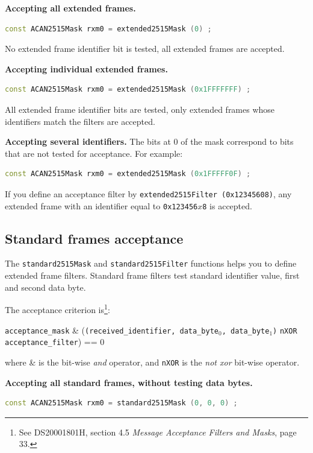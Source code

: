 \documentclass[9pt, a4paper, obeyspaces]{extarticle}
\begin{document}
{\bf Accepting all extended frames.}
{ \small\begin{lstlisting}[language=c++]
  const ACAN2515Mask rxm0 = extended2515Mask (0) ;
\end{lstlisting}}
No extended frame identifier bit is tested, all extended frames are accepted.

{\bf Accepting individual extended frames.}
{ \small\begin{lstlisting}[language=c++]
  const ACAN2515Mask rxm0 = extended2515Mask (0x1FFFFFFF) ;
\end{lstlisting}}
All extended frame identifier bits are tested, only extended frames whose identifiers match the filters are accepted.


{\bf Accepting several identifiers.}
The bits at 0 of the mask correspond to bits that are not tested for acceptance. For example:
{ \small\begin{lstlisting}[language=c++]
  const ACAN2515Mask rxm0 = extended2515Mask (0x1FFFFF0F) ;
\end{lstlisting}}

If you define an acceptance filter by \texttt{extended2515Filter (0x12345608)}, any extended frame with an identifier equal to \texttt{0x123456$x$8} is accepted.












\subsection{Standard frames acceptance}

The \texttt{standard2515Mask} and \texttt{standard2515Filter} functions helps you to define extended frame filters. Standard frame filters test standard identifier value, first and second data byte.

The acceptance criterion is\footnote{See DS20001801H, section 4.5 \emph{Message Acceptance Filters and Masks}, page 33.}:

\begin{center}\small
\texttt{acceptance\_mask} \& (\texttt{(received\_identifier, data\_byte$_0$, data\_byte$_1$)} \texttt{nXOR} \texttt{acceptance\_filter}) == 0
\end{center}
where \& is the bit-wise \emph{and} operator, and \texttt{nXOR} is the \emph{not xor} bit-wise operator.

{\bf Accepting all standard frames, without testing data bytes.}
{ \small\begin{lstlisting}[language=c++]
  const ACAN2515Mask rxm0 = standard2515Mask (0, 0, 0) ;
\end{lstlisting}}
\end{document}
